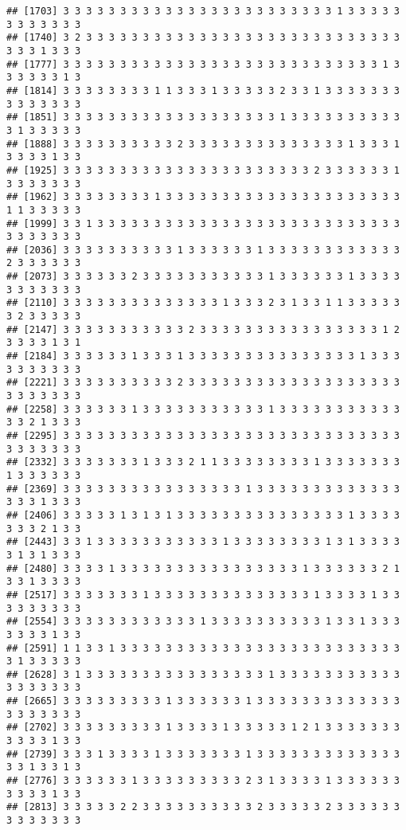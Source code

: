 \documentclass[
]{article}
\begin{document}
\begin{verbatim}
## [1703] 3 3 3 3 3 3 3 3 3 3 3 3 3 3 3 3 3 3 3 3 3 3 3 3 1 3 3 3 3 3 3 3 3 3 3 3 3
## [1740] 3 2 3 3 3 3 3 3 3 3 3 3 3 3 3 3 3 3 3 3 3 3 3 3 3 3 3 3 3 3 3 3 3 1 3 3 3
## [1777] 3 3 3 3 3 3 3 3 3 3 3 3 3 3 3 3 3 3 3 3 3 3 3 3 3 3 3 3 1 3 3 3 3 3 3 1 3
## [1814] 3 3 3 3 3 3 3 3 1 1 3 3 3 1 3 3 3 3 3 2 3 3 1 3 3 3 3 3 3 3 3 3 3 3 3 3 3
## [1851] 3 3 3 3 3 3 3 3 3 3 3 3 3 3 3 3 3 3 3 1 3 3 3 3 3 3 3 3 3 3 3 1 3 3 3 3 3
## [1888] 3 3 3 3 3 3 3 3 3 3 2 3 3 3 3 3 3 3 3 3 3 3 3 3 3 1 3 3 3 1 3 3 3 3 1 3 3
## [1925] 3 3 3 3 3 3 3 3 3 3 3 3 3 3 3 3 3 3 3 3 3 3 2 3 3 3 3 3 3 1 3 3 3 3 3 3 3
## [1962] 3 3 3 3 3 3 3 3 1 3 3 3 3 3 3 3 3 3 3 3 3 3 3 3 3 3 3 3 3 3 1 1 3 3 3 3 3
## [1999] 3 3 1 3 3 3 3 3 3 3 3 3 3 3 3 3 3 3 3 3 3 3 3 3 3 3 3 3 3 3 3 3 3 3 3 3 3
## [2036] 3 3 3 3 3 3 3 3 3 3 1 3 3 3 3 3 3 1 3 3 3 3 3 3 3 3 3 3 3 3 2 3 3 3 3 3 3
## [2073] 3 3 3 3 3 3 2 3 3 3 3 3 3 3 3 3 3 3 1 3 3 3 3 3 3 1 3 3 3 3 3 3 3 3 3 3 3
## [2110] 3 3 3 3 3 3 3 3 3 3 3 3 3 3 1 3 3 3 2 3 1 3 3 1 1 3 3 3 3 3 3 2 3 3 3 3 3
## [2147] 3 3 3 3 3 3 3 3 3 3 3 2 3 3 3 3 3 3 3 3 3 3 3 3 3 3 3 3 1 2 3 3 3 3 1 3 1
## [2184] 3 3 3 3 3 3 1 3 3 3 1 3 3 3 3 3 3 3 3 3 3 3 3 3 3 3 1 3 3 3 3 3 3 3 3 3 3
## [2221] 3 3 3 3 3 3 3 3 3 3 2 3 3 3 3 3 3 3 3 3 3 3 3 3 3 3 3 3 3 3 3 3 3 3 3 3 3
## [2258] 3 3 3 3 3 3 1 3 3 3 3 3 3 3 3 3 3 3 1 3 3 3 3 3 3 3 3 3 3 3 3 3 2 1 3 3 3
## [2295] 3 3 3 3 3 3 3 3 3 3 3 3 3 3 3 3 3 3 3 3 3 3 3 3 3 3 3 3 3 3 3 3 3 3 3 3 3
## [2332] 3 3 3 3 3 3 3 1 3 3 3 2 1 1 3 3 3 3 3 3 3 3 1 3 3 3 3 3 3 3 1 3 3 3 3 3 3
## [2369] 3 3 3 3 3 3 3 3 3 3 3 3 3 3 3 3 1 3 3 3 3 3 3 3 3 3 3 3 3 3 3 3 3 1 3 3 3
## [2406] 3 3 3 3 3 1 3 1 3 1 3 3 3 3 3 3 3 3 3 3 3 3 3 3 3 1 3 3 3 3 3 3 3 2 1 3 3
## [2443] 3 3 1 3 3 3 3 3 3 3 3 3 3 3 1 3 3 3 3 3 3 3 3 1 3 1 3 3 3 3 3 1 3 1 3 3 3
## [2480] 3 3 3 3 1 3 3 3 3 3 3 3 3 3 3 3 3 3 3 3 3 1 3 3 3 3 3 3 2 1 3 3 1 3 3 3 3
## [2517] 3 3 3 3 3 3 3 1 3 3 3 3 3 3 3 3 3 3 3 3 3 3 1 3 3 3 3 1 3 3 3 3 3 3 3 3 3
## [2554] 3 3 3 3 3 3 3 3 3 3 3 3 1 3 3 3 3 3 3 3 3 3 3 1 3 3 1 3 3 3 3 3 3 3 1 3 3
## [2591] 1 1 3 3 1 3 3 3 3 3 3 3 3 3 3 3 3 3 3 3 3 3 3 3 3 3 3 3 3 3 3 1 3 3 3 3 3
## [2628] 3 1 3 3 3 3 3 3 3 3 3 3 3 3 3 3 3 3 1 3 3 3 3 3 3 3 3 3 3 3 3 3 3 3 3 3 3
## [2665] 3 3 3 3 3 3 3 3 3 1 3 3 3 3 3 3 1 3 3 3 3 3 3 3 3 3 3 3 3 3 3 3 3 3 3 3 3
## [2702] 3 3 3 3 3 3 3 3 3 1 3 3 3 3 1 3 3 3 3 3 1 2 1 3 3 3 3 3 3 3 3 3 3 3 1 3 3
## [2739] 3 3 3 1 3 3 3 3 1 3 3 3 3 3 3 3 1 3 3 3 3 3 3 3 3 3 3 3 3 3 3 3 1 3 3 1 3
## [2776] 3 3 3 3 3 3 1 3 3 3 3 3 3 3 3 3 2 3 1 3 3 3 3 1 3 3 3 3 3 3 3 3 3 3 1 3 3
## [2813] 3 3 3 3 3 2 2 3 3 3 3 3 3 3 3 3 3 2 3 3 3 3 3 2 3 3 3 3 3 3 3 3 3 3 3 3 3

\end{verbatim}
\end{document}
